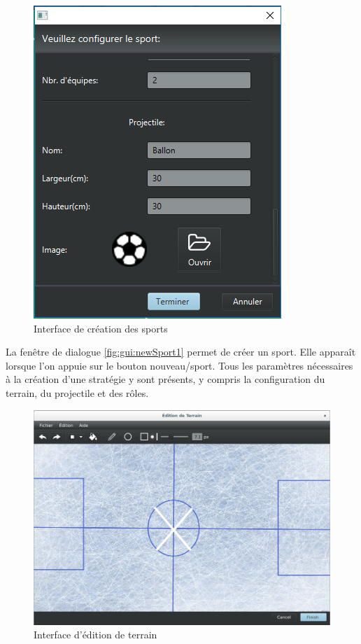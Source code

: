 \begin{figure}[htpb]
    \centering
    \includegraphics[scale=0.6]{fig/gui/newSport3.png}
    \caption{Interface de création des sports}
    \label{fig:gui:newSport3}
\end{figure}

La fenêtre de dialogue \ref{fig:gui:newSport1} permet de créer un sport.
Elle apparaît lorsque l'on appuie sur le bouton nouveau/sport.
Tous les paramètres nécessaires à la création d'une stratégie y sont présents, y compris la configuration du terrain, du projectile et des rôles.

\newpage

\begin{figure}[htpb]
    \centering
    \includegraphics[scale=0.35]{fig/gui/gui_edit_field.png}
    \caption{Interface d'édition de terrain}
    \label{fig:gui:terrain}
\end{figure}

